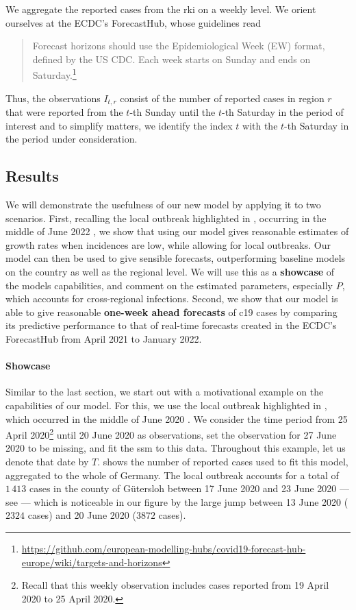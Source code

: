 We aggregate the reported cases from the \gls{rki} on a weekly level. We orient ourselves at the ECDC's ForecastHub, whose guidelines read
\begin{quote}
    Forecast horizons should use the Epidemiological Week (EW) format, defined by the US CDC. Each week starts on Sunday and ends on Saturday.\footnote{\url{https://github.com/european-modelling-hubs/covid19-forecast-hub-europe/wiki/targets-and-horizons}}
\end{quote}
Thus, the observations $I_{t, r}$ consist of the number of reported cases in region $r$ that were reported from the $t$-th Sunday until the $t$-th Saturday in the period of interest and to simplify matters, we identify the index $t$ with the $t$-th Saturday in the period under consideration. 

\subsection{Results}
We will demonstrate the usefulness of our new model by applying it to two scenarios. First, recalling the local outbreak highlighted in , occurring in the middle of June 2022 \citep{Gunther2020SARSCoV2}, we show that using our model gives reasonable estimates of growth rates when incidences are low, while allowing for local outbreaks. Our model can then be used to give sensible forecasts, outperforming baseline models on the country as well as the regional level. We will use this as a \textbf{showcase} of the models capabilities, and comment on the estimated parameters, especially $P$, which accounts for cross-regional infections.
Second, we show that our model is able to give reasonable \textbf{one-week ahead forecasts} of \gls{c19} cases by comparing its predictive performance to that of real-time forecasts created in the ECDC's ForecastHub from April 2021 to January 2022.

\paragraph{Showcase}
Similar to the last section, we start out with a motivational example on the capabilities of our model. For this, we use the local outbreak highlighted in , which occurred in the middle of June 2020 \citep{Gunther2020SARSCoV2}. We consider the time period from 25 April 2020\footnote{Recall that this weekly observation includes cases reported from 19 April 2020 to 25 April 2020.} until 20 June 2020 as observations, set the observation for 27 June 2020 to be missing, and fit the \gls{ssm} to this data. Throughout this example, let us denote that date by $T$.  shows the number of reported cases used to fit this model, aggregated to the whole of Germany. The local outbreak accounts for a total of $1\,413$ cases in the county of Gütersloh between 17 June 2020 and 23 June 2020 --- see \citep[Figure 1]{Gunther2020SARSCoV2} --- which is noticeable in our figure by the large jump between 13 June 2020 ($2324$ cases) and 20 June 2020 ($3872$ cases). 


